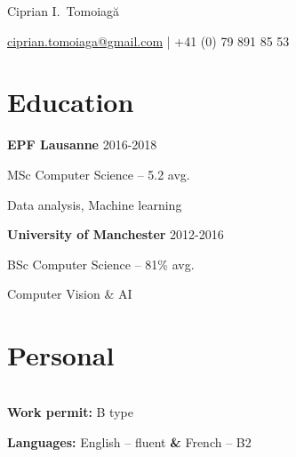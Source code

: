 \documentclass[11pt,a4paper]{article}
\begin{document}
  \noindent
  \begin{center} %
    {\LARGE Ciprian I.~Tomoiagă}
    \vspace*{-0.5em}

    \href{mailto:ciprian.tomoiaga@gmail.com}{\textsf{ciprian.tomoiaga@gmail.com}}
    | \textsf{+41 (0) 79 891 85 53}
  \end{center}

\begin{minipage}[t]{0.48\textwidth}
\section*{Education}
  \textbf{EPF Lausanne} \hfill 2016-2018\par
  MSc Computer Science -- 5.2 avg.\par
  Data analysis, Machine learning \par
  \vspace{0.35em}
  \textbf{University of Manchester} \hfill 2012-2016\par
  BSc Computer Science -- 81\% avg. \par
  Computer Vision \& AI
\end{minipage}
\quad
\begin{minipage}[t]{0.49\textwidth}
  \section*{Personal}
  \tabulinesep=0pt
  \vspace{-0.25em} %
  \begin{tabu} to 1.1
  \end{tabu}\par
  \vspace{0.45em} %
  \textbf{Work permit:} B type\par
  \textbf{Languages:} English -- fluent \textbf{\&} French -- B2\par
\end{minipage}

\vspace{1em}
\end{document}
